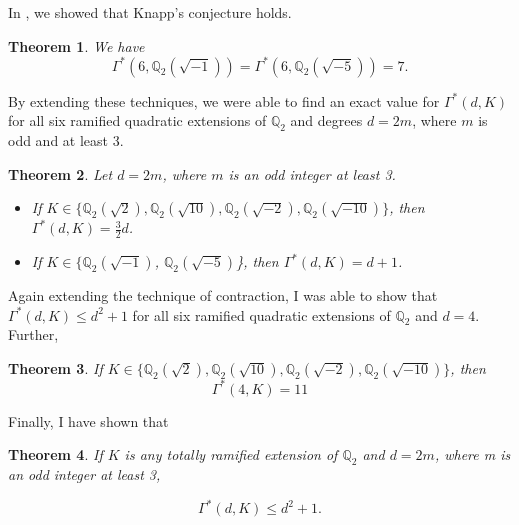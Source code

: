 \documentclass{article}
\newtheorem{theorem}{Theorem}
\begin{document}
In \cite{2020arXiv200509770D}, we showed that Knapp's conjecture holds.

\begin{theorem}
We have $$\Gamma^*(6, \mathbb{Q}_2(\sqrt{-1})) = \Gamma^*(6, \mathbb{Q}_2(\sqrt{-5})) = 7. $$
\end{theorem}

By extending these techniques, we were able to find an exact value for $\Gamma^*(d,K)$ for all six ramified quadratic extensions of $\mathbb{Q}_2$ and degrees $d=2m$, where $m$ is odd and at least 3. \cite{2020arXiv201006833D}

\begin{theorem} \label{theo}
Let $d=2m$, where $m$ is an odd integer at least 3.
\begin{itemize}
    \item If $K \in \{\mathbb{Q}_2(\sqrt{2}), \mathbb{Q}_2(\sqrt{10}), \mathbb{Q}_2(\sqrt{-2}), \mathbb{Q}_2(\sqrt{-10})\}$, then $\Gamma^*(d,K) = \frac{3}{2}d$.
    \item If $K \in  \{\mathbb{Q}_2(\sqrt{-1})$, $\mathbb{Q}_2(\sqrt{-5})$\}, then $\Gamma^*(d,K) = d+1$.
\end{itemize}
\end{theorem}

Again extending the technique of contraction, I was able to show that $\Gamma^*(d,K) \le d^2 + 1$ for all six ramified quadratic extensions of $\mathbb{Q}_2$ and $d=4$.  Further,

\begin{theorem}
If $K \in \{\mathbb{Q}_2(\sqrt{2}), \mathbb{Q}_2(\sqrt{10}), \mathbb{Q}_2(\sqrt{-2}), \mathbb{Q}_2(\sqrt{-10})\}$, then  $$\Gamma^*(4, K) = 11$$
\end{theorem}

Finally, I have shown that

\begin{theorem}
If $K$ is any totally ramified extension of $\mathbb{Q}_2$ and $d=2m$, where m is an odd integer at least 3,

$$\Gamma^*(d,K) \le d^2+1.$$
\end{theorem}



\end{document}
